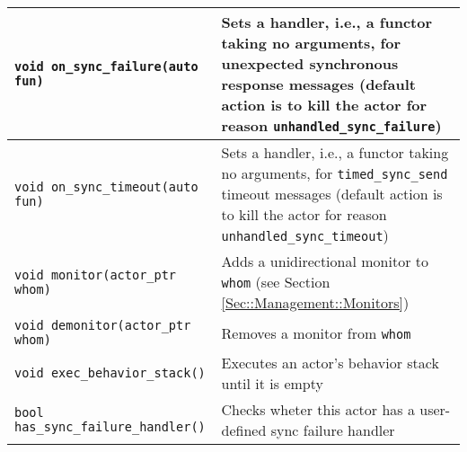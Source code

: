 {\begin{tabular*}{\textwidth}{m{}m{}}
  \hline
  \lstinline^void on_sync_failure(auto fun)^ & Sets a handler, i.e., a functor taking no arguments, for unexpected synchronous response messages (default action is to kill the actor for reason \lstinline^unhandled_sync_failure^) \\
  \hline
  \lstinline^void on_sync_timeout(auto fun)^ & Sets a handler, i.e., a functor taking no arguments, for \lstinline^timed_sync_send^ timeout messages (default action is to kill the actor for reason \lstinline^unhandled_sync_timeout^) \\
  \hline
  \lstinline^void monitor(actor_ptr whom)^ & Adds a unidirectional monitor to \lstinline^whom^ (see Section \ref{Sec::Management::Monitors}) \\
  \hline
  \lstinline^void demonitor(actor_ptr whom)^ & Removes a monitor from \lstinline^whom^ \\
  \hline
  \lstinline^void exec_behavior_stack()^ & Executes an actor's behavior stack until it is empty \\
  \hline
  \lstinline^bool has_sync_failure_handler()^ & Checks wheter this actor has a user-defined sync failure handler \\
  \hline
\end{tabular*}
}
